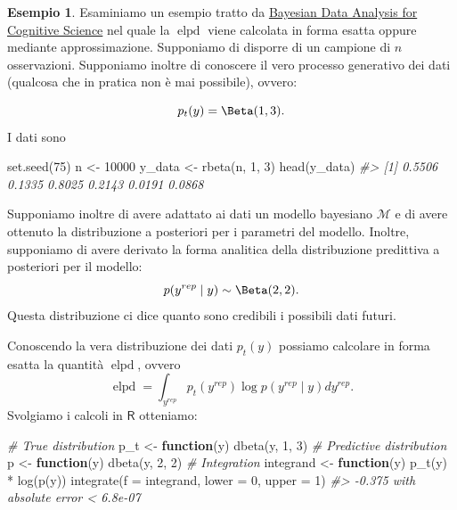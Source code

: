 \documentclass[
  10pt,
  italian,
  a4paper,
  extrafontsizes,onecolumn,openright
  ]{memoir}
\newenvironment{Shaded}{\begin{snugshade}}{\end{snugshade}}
\newcommand{\AttributeTok}[1]{\textcolor[rgb]{0.77,0.63,0.00}{#1}}
\newcommand{\CommentTok}[1]{\textcolor[rgb]{0.56,0.35,0.01}{\textit{#1}}}
\newcommand{\ControlFlowTok}[1]{\textcolor[rgb]{0.13,0.29,0.53}{\textbf{#1}}}
\newcommand{\DecValTok}[1]{\textcolor[rgb]{0.00,0.00,0.81}{#1}}
\newcommand{\FunctionTok}[1]{\textcolor[rgb]{0.00,0.00,0.00}{#1}}
\newcommand{\NormalTok}[1]{#1}
\newcommand{\OtherTok}[1]{\textcolor[rgb]{0.56,0.35,0.01}{#1}}
\newcommand{\SpecialCharTok}[1]{\textcolor[rgb]{0.00,0.00,0.00}{#1}}
\DeclareMathOperator{\elpd}{elpd} %
\newcommand{\R}{\textsf{R}} %
\theoremstyle{definition}
\theoremstyle{definition}
\newtheorem{example}{Esempio}[chapter]
\theoremstyle{definition}
\theoremstyle{definition}
\theoremstyle{remark}
\begin{document}
\begin{example}
Esaminiamo un esempio tratto da \href{https://vasishth.github.io/bayescogsci/book/expected-log-predictive-density-of-a-model.html}{Bayesian Data Analysis for Cognitive Science} nel quale la \(\elpd\) viene calcolata in forma esatta oppure mediante approssimazione. Supponiamo di disporre di un campione di \(n\) osservazioni. Supponiamo inoltre di conoscere il vero processo generativo dei dati (qualcosa che in pratica non è mai possibile), ovvero:

\[
p_t(y) = \Beta(1, 3).
\]
I dati sono

\begin{Shaded}
\begin{Highlighting}[]
\FunctionTok{set.seed}\NormalTok{(}\DecValTok{75}\NormalTok{)}
\NormalTok{n }\OtherTok{\textless{}{-}} \DecValTok{10000}
\NormalTok{y\_data }\OtherTok{\textless{}{-}} \FunctionTok{rbeta}\NormalTok{(n, }\DecValTok{1}\NormalTok{, }\DecValTok{3}\NormalTok{)}
\FunctionTok{head}\NormalTok{(y\_data)}
\CommentTok{\#\textgreater{} [1] 0.5506 0.1335 0.8025 0.2143 0.0191 0.0868}
\end{Highlighting}
\end{Shaded}

\noindent
Supponiamo inoltre di avere adattato ai dati un modello bayesiano \(\mathcal{M}\) e di avere ottenuto la distribuzione a posteriori per i parametri del modello. Inoltre, supponiamo di avere derivato la forma analitica della distribuzione predittiva a posteriori per il modello:
\[
p(y^{rep} \mid y) \sim \Beta(2, 2).
\]
Questa distribuzione ci dice quanto sono credibili i possibili dati futuri.

Conoscendo la vera distribuzione dei dati \(p_t(y)\) possiamo calcolare in forma esatta la quantità \(\elpd\), ovvero
\[
\elpd = \int_{y^{rep}}p_{t}(y^{rep})\log p(y^{rep} \mid y) dy^{rep}.
\]
\noindent
Svolgiamo i calcoli in \(\R\) otteniamo:

\begin{Shaded}
\begin{Highlighting}[]
\CommentTok{\# True distribution}
\NormalTok{p\_t }\OtherTok{\textless{}{-}} \ControlFlowTok{function}\NormalTok{(y) }\FunctionTok{dbeta}\NormalTok{(y, }\DecValTok{1}\NormalTok{, }\DecValTok{3}\NormalTok{)}
\CommentTok{\# Predictive distribution}
\NormalTok{p }\OtherTok{\textless{}{-}} \ControlFlowTok{function}\NormalTok{(y) }\FunctionTok{dbeta}\NormalTok{(y, }\DecValTok{2}\NormalTok{, }\DecValTok{2}\NormalTok{)}
\CommentTok{\# Integration}
\NormalTok{integrand }\OtherTok{\textless{}{-}} \ControlFlowTok{function}\NormalTok{(y) }\FunctionTok{p\_t}\NormalTok{(y) }\SpecialCharTok{*} \FunctionTok{log}\NormalTok{(}\FunctionTok{p}\NormalTok{(y))}
\FunctionTok{integrate}\NormalTok{(}\AttributeTok{f =}\NormalTok{ integrand, }\AttributeTok{lower =} \DecValTok{0}\NormalTok{, }\AttributeTok{upper =} \DecValTok{1}\NormalTok{)}
\CommentTok{\#\textgreater{} {-}0.375 with absolute error \textless{} 6.8e{-}07}
\end{Highlighting}
\end{Shaded}


\end{example}
\end{document}
